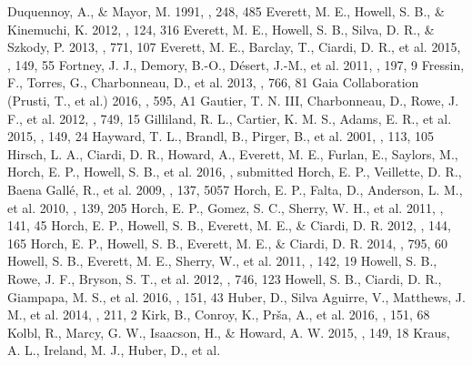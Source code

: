 \documentclass[twocolumn,appendixfloats]{aastex6}
\begin{document}
\begin{thebibliography}{}
 Duquennoy, A., \& Mayor, M.
1991, \aap, 248, 485
 Everett, M. E., Howell, S. B., \& Kinemuchi, K.
2012, \pasp, 124, 316
 Everett, M. E., Howell, S. B., Silva, D. R.,
\& Szkody, P.  2013, \apj, 771, 107 
 Everett, M. E., Barclay, T., Ciardi, D. R.,
et al.  2015, \aj, 149, 55
 Fortney, J. J., Demory, B.-O., D\'esert, J.-M.,
et al.  2011, \apjs, 197, 9
 Fressin, F., Torres, G., Charbonneau, D.,
et al.  2013, \apj, 766, 81
 Gaia Collaboration (Prusti, T., et al.) 2016,
\aap, 595, A1
 Gautier, T. N. III, Charbonneau, D., Rowe, J. F.,
et al.  2012, \apj, 749, 15
 Gilliland, R. L., Cartier, K. M. S., Adams, E. R.,
et al.  2015, \aj, 149, 24
 Hayward, T. L., Brandl, B., Pirger, B.,
et al.  2001, \pasp, 113, 105
 Hirsch, L. A., Ciardi, D. R., Howard, A., 
Everett, M. E., Furlan, E., Saylors, M., Horch, E. P., Howell, S. B., et al. 2016,
\aj, submitted
 Horch, E. P., Veillette, D. R., Baena Gall\'e, R.,
et al.  2009, \aj, 137, 5057
 Horch, E. P., Falta, D., Anderson, L. M., et al.
2010, \aj, 139, 205
 Horch, E. P., Gomez, S. C., Sherry, W. H.,
et al.  2011, \aj, 141, 45
 Horch, E. P., Howell, S. B., Everett, M. E., \&
Ciardi, D. R.  2012, \aj, 144, 165
 Horch, E. P., Howell, S. B., Everett, M. E., \&
Ciardi, D. R.  2014, \apj, 795, 60
 Howell, S. B., Everett, M. E., Sherry, W., et al.
2011, \aj, 142, 19
 Howell, S. B., Rowe, J. F., Bryson, S. T., et al.
2012, \apj, 746, 123
 Howell, S. B., Ciardi, D. R., Giampapa, M. S.,
et al.  2016, \aj, 151, 43
 Huber, D., Silva Aguirre, V., Matthews, J. M.,
et al.  2014, \apjs, 211, 2
 Kirk, B., Conroy, K., Pr\v{s}a, A., et al.  2016,
\aj, 151, 68
 Kolbl, R., Marcy, G. W., Isaacson, H., \&
Howard, A. W.  2015, \aj, 149, 18
 Kraus, A. L., Ireland, M. J., Huber, D., et al.

\end{thebibliography}
\end{document}
